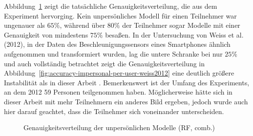 Abbildung~\ref{fig:accuracy-impersonal-per-user} zeigt die tatsächliche Genauigkeitsverteilung, die aus dem Experiment hervorging. Kein unpersönliches Modell für einen Teilnehmer war ungenauer als $65 \%$, während über $80 \%$ der Teilnehmer sogar Modelle mit einer Genauigkeit von mindestens $75 \%$ besaßen. In der Untersuchung von Weiss et al. (2012), in der Daten des Beschleunigungssensors eines Smartphones ähnlich aufgenommen und transformiert wurden, lag die untere Schranke bei nur $25 \%$ und auch vollständig betrachtet zeigt die Genauigkeitsverteilung in Abbildung~\ref{fig:accuracy-impersonal-per-user-weiss2012} eine deutlich größere Instabilität als in dieser Arbeit \cite{Weiss2012}. Bemerkenswert ist der Umfang des Experiments, an dem 2012 59 Personen teilgenommen haben. Möglicherweise hätte sich in dieser Arbeit mit mehr Teilnehmern ein anderes Bild ergeben, jedoch wurde auch hier darauf geachtet, dass die Teilnehmer sich voneinander unterscheiden. 
\begin{figure}
	\centering
	\caption{Genauigkeitsverteilung der unpersönlichen Modelle (RF, comb.)}
	\label{fig:accuracy-impersonal-per-user}
\end{figure}


